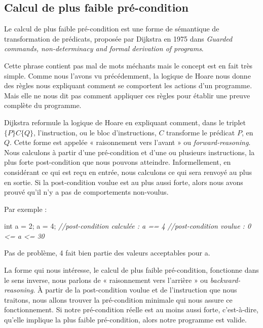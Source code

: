 \documentclass[12pt,francais,]{scrbook}
\newenvironment{Shaded}{}{}
\newcommand{\DataTypeTok}[1]{\textcolor[rgb]{0.56,0.13,0.00}{{#1}}}
\newcommand{\DecValTok}[1]{\textcolor[rgb]{0.25,0.63,0.44}{{#1}}}
\newcommand{\CommentTok}[1]{\textcolor[rgb]{0.38,0.63,0.69}{\textit{{#1}}}}
\newcommand{\NormalTok}[1]{{#1}}
\begin{document}
\subsection{Calcul de plus faible
pré-condition}\label{calcul-de-plus-faible-pruxe9-condition}

Le calcul de plus faible pré-condition est une forme de sémantique de
transformation de prédicats, proposée par Dijkstra en 1975 dans
\emph{Guarded commands, non-determinacy and formal derivation of
programs}.

Cette phrase contient pas mal de mots méchants mais le concept est en
fait très simple. Comme nous l'avons vu précédemment, la logique de
Hoare nous donne des règles nous expliquant comment se comportent les
actions d'un programme. Mais elle ne nous dit pas comment appliquer ces
règles pour établir une preuve complète du programme.

Dijkstra reformule la logique de Hoare en expliquant comment, dans le
triplet \(\{P\}C\{Q\}\), l'instruction, ou le bloc d'instructions, \(C\)
transforme le prédicat \(P\), en \(Q\). Cette forme est appelée «
raisonnement vers l'avant » ou \emph{forward-reasoning}. Nous calculons
à partir d'une pré-condition et d'une ou plusieurs instructions, la plus
forte post-condition que nous pouvons atteindre. Informellement, en
considérant ce qui est reçu en entrée, nous calculons ce qui sera
renvoyé au plus en sortie. Si la post-condition voulue est au plus aussi
forte, alors nous avons prouvé qu'il n'y a pas de comportements
non-voulus.

Par exemple :

\begin{footnotesize}\begin{Shaded}
\begin{Highlighting}[]
\DataTypeTok{int} \NormalTok{a = }\DecValTok{2}\NormalTok{;}
\NormalTok{a = }\DecValTok{4}\NormalTok{;}
\CommentTok{//post-condition calculée : a == 4}
\CommentTok{//post-condition voulue   : 0 <= a <= 30}
\end{Highlighting}
\end{Shaded}\end{footnotesize}

Pas de problème, 4 fait bien partie des valeurs acceptables pour a.

La forme qui nous intéresse, le calcul de plus faible pré-condition,
fonctionne dans le sens inverse, nous parlons de « raisonnement vers
l'arrière » ou \emph{backward-reasoning}. À partir de la post-condition
voulue et de l'instruction que nous traitons, nous allons trouver la
pré-condition minimale qui nous assure ce fonctionnement. Si notre
pré-condition réelle est au moins aussi forte, c'est-à-dire, qu'elle
implique la plus faible pré-condition, alors notre programme est valide.
\end{document}
